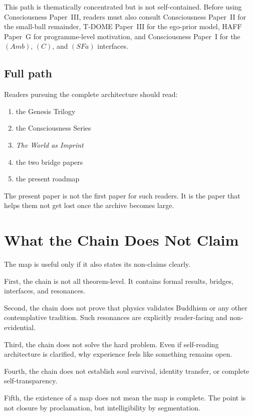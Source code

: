 \documentclass[12pt,a4paper]{article}
\begin{document}
This path is thematically concentrated but is not self-contained. Before using
Consciousness Paper~III, readers must also consult Consciousness Paper~II for
the small-ball remainder, T-DOME Paper~III for the ego-prior model, HAFF
Paper~G for programme-level motivation, and Consciousness Paper~I for the
\((Amb)\), \((C)\), and \((SFa)\) interfaces.

\subsection{Full path}

Readers pursuing the complete architecture should read:

\begin{enumerate}
\item the Genesis Trilogy
\item the Consciousness Series
\item \emph{The World as Imprint}
\item the two bridge papers
\item the present roadmap
\end{enumerate}

The present paper is not the first paper for such readers. It is the paper that helps them not get lost once the archive becomes large.

\section{What the Chain Does Not Claim}

The map is useful only if it also states its non-claims clearly.

First, the chain is not all theorem-level. It contains formal results, bridges, interfaces, and resonances.

Second, the chain does not prove that physics validates Buddhism or any other contemplative tradition. Such resonances are explicitly reader-facing and non-evidential.

Third, the chain does not solve the hard problem. Even if self-reading architecture is clarified, why experience feels like something remains open.

Fourth, the chain does not establish soul survival, identity transfer, or complete self-transparency.

Fifth, the existence of a map does not mean the map is complete. The point is not closure by proclamation, but intelligibility by segmentation.
\end{document}
